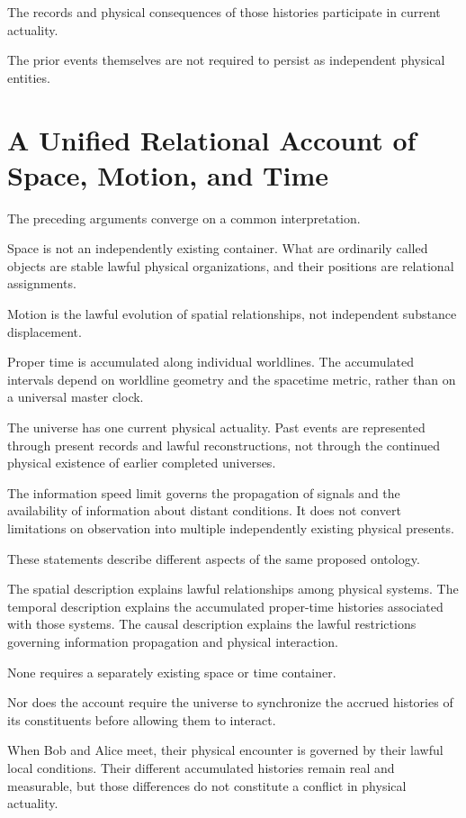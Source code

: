 \documentclass[12pt,onecolumn]{article}
\begin{document}
The records and physical consequences of those histories participate in current actuality.

The prior events themselves are not required to persist as independent physical entities.

\section{A Unified Relational Account of Space, Motion, and Time}

The preceding arguments converge on a common interpretation.

Space is not an independently existing container. What are ordinarily called objects are stable lawful physical organizations, and their positions are relational assignments.

Motion is the lawful evolution of spatial relationships, not independent substance displacement.

Proper time is accumulated along individual worldlines. The accumulated intervals depend on worldline geometry and the spacetime metric, rather than on a universal master clock.

The universe has one current physical actuality. Past events are represented through present records and lawful reconstructions, not through the continued physical existence of earlier completed universes.

The information speed limit governs the propagation of signals and the availability of information about distant conditions. It does not convert limitations on observation into multiple independently existing physical presents.

These statements describe different aspects of the same proposed ontology.

The spatial description explains lawful relationships among physical systems. The temporal description explains the accumulated proper-time histories associated with those systems. The causal description explains the lawful restrictions governing information propagation and physical interaction.

None requires a separately existing space or time container.

Nor does the account require the universe to synchronize the accrued histories of its constituents before allowing them to interact.

When Bob and Alice meet, their physical encounter is governed by their lawful local conditions. Their different accumulated histories remain real and measurable, but those differences do not constitute a conflict in physical actuality.
\end{document}

